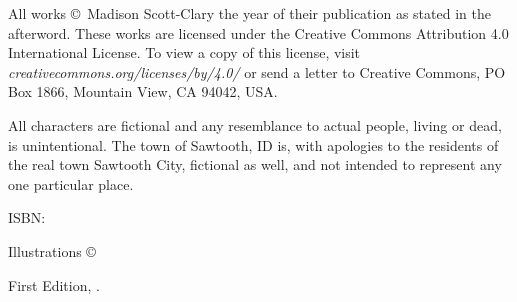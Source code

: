 \singlespacing
\thispagestyle{empty}
\null
\vfill
{\small\parindent0pt
\noindent All works \copyright\ Madison Scott-Clary the year of their publication as stated in the afterword. These works are licensed under the Creative Commons Attribution 4.0 International License. To view a copy of this license, visit \mbox{\emph{creativecommons.org/licenses/by/4.0/}} or send a letter to Creative Commons, PO Box 1866, Mountain View, CA 94042, USA.

All characters are fictional and any resemblance to actual people, living or dead, is unintentional. The town of Sawtooth, ID is, with apologies to the residents of the real town Sawtooth City, fictional as well, and not intended to represent any one particular place.

\vspace{1ex}

ISBN: \ISBN

\vspace{1ex}

\emph{\Title}

\vspace{1ex}

Illustrations \copyright\ \Year\ \Illustrator\\
\IllustratorWeb

\vspace{1ex}

First Edition, \Year.

\EditionsList
}

\cleardoublepage
